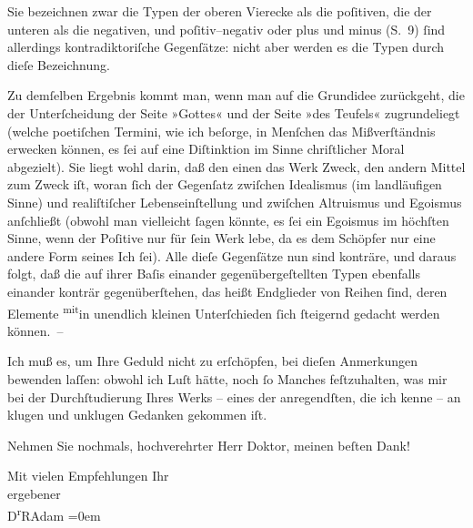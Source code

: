 \pstart
           Sie bezeichnen zwar die Typen der oberen Vierecke als die poſitiven, die der unteren
               als die negativen, und poſitiv–negativ oder plus und
               minus (S. 9){ }ſind allerdings
               kontradiktoriſche Gegenſätze: nicht aber werden es die Typen durch dieſe
               Bezeichnung.\pend
           
\pstart
           Zu demſelben Ergebnis kommt {\pb}man, wenn man
               auf die Grundidee zurückgeht, die der Unterſcheidung der Seite »Gottes« und der Seite
               »des Teufels« zugrundeliegt (welche poetiſchen Termini, wie ich beſorge, in Menſchen
               das Mißverſtändnis erwecken können, es{ }ſei auf eine Diſtinktion im Sinne chriſtlicher
               Moral abgezielt). Sie liegt wohl darin, daß den einen das Werk Zweck, den andern
               Mittel zum Zweck iſt, woran{ }ſich der Gegenſatz zwiſchen Idealismus (im landläufigen
               Sinne) und realiſtiſcher Lebenseinſtellung und zwiſchen Altruismus und Egoismus
               anſchließt (obwohl man vielleicht{ }ſagen könnte, es{ }ſei ein Egoismus im höchſten
               Sinne, wenn der Poſitive nur für{ }ſein Werk lebe, da es dem Schöpfer nur eine andere
               Form seines Ich{ }ſei). {\pb}Alle dieſe
               Gegenſätze nun sind konträre, und daraus folgt, daß die auf ihrer Baſis einander
               gegenübergeſtellten Typen ebenfalls einander konträr gegenüberſtehen, das heißt
               Endglieder von Reihen{ }ſind, deren Elemente \substVorne{}\textsuperscript{mit}\substDazwischen{}in\substHinten{} unendlich kleinen Unterſchieden{ }ſich{ }ſteigernd gedacht werden können. –\pend
           
\pstart
           Ich muß es, um Ihre Geduld nicht zu erſchöpfen, \strikeout{\textcolor{gray}{an}} bei dieſen Anmerkungen bewenden laſſen: obwohl ich Luſt hätte, noch{ }ſo Manches
               feſtzuhalten, was mir bei der Durchſtudierung Ihres Werks – eines der anregendſten,
               die ich kenne – an klugen und unklugen Gedanken gekommen iſt.\pend
           
\pstart
           Nehmen Sie nochmals, hochverehrter Herr Doktor, meinen beſten {\pb}Dank!\pend
           
\pstart
           Mit vielen Empfehlungen Ihr{\\[\baselineskip]}ergebener{\\[\baselineskip]}\spacefill\mbox{D\textsuperscript{r}RAdam}\pend
           \leftskip=0em{}\endnumbering{}  \newcommand{\dateiname}{L02483}\newcommand{\titel}{Robert Adam an Arthur Schnitzler, 21. 3. 1927}\newcommand{\editorInnen}{Martin Anton Müller und Gerd-Hermann Susen}
